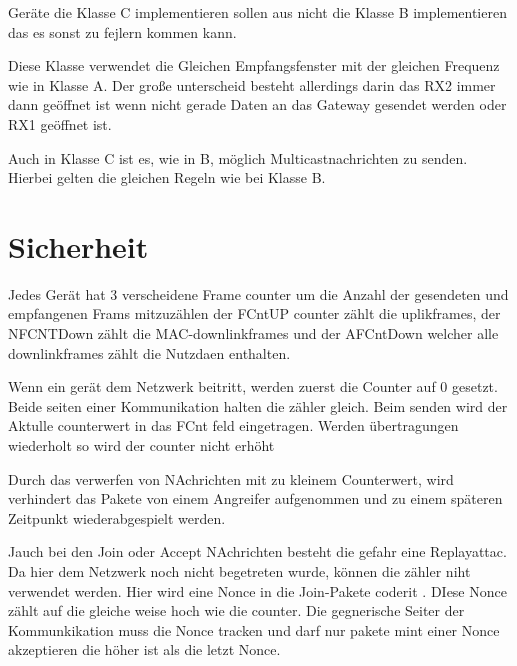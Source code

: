 \documentclass[a4paper,12pt]{article}
\begin{document}
            Geräte die Klasse C implementieren sollen aus nicht die Klasse B implementieren das es sonst zu fejlern 
            kommen kann.

            Diese Klasse verwendet die Gleichen Empfangsfenster mit der gleichen Frequenz wie in Klasse A. Der große 
            unterscheid besteht allerdings darin das RX2 immer dann geöffnet ist wenn nicht gerade Daten an das 
            Gateway gesendet werden oder RX1 geöffnet ist. 

            Auch in Klasse C ist es, wie in B, möglich Multicastnachrichten zu senden. Hierbei gelten die gleichen 
            Regeln wie bei Klasse B.

    \section{Sicherheit} \label{sec:Sicherheit}
   
                
       

        \bigbreak

        Jedes Gerät hat 3 verscheidene Frame counter um die Anzahl der gesendeten und empfangenen Frams mitzuzählen der FCntUP counter zählt die
        uplikframes, der NFCNTDown zählt die MAC-downlinkframes und der AFCntDown welcher alle downlinkframes zählt die Nutzdaen enthalten.

        Wenn ein gerät dem Netzwerk beitritt, werden zuerst die Counter auf 0 gesetzt. Beide seiten einer Kommunikation halten die zähler gleich. 
        Beim senden wird der Aktulle counterwert in das FCnt feld eingetragen. Werden übertragungen wiederholt so wird der counter nicht erhöht 

        Durch das verwerfen von NAchrichten mit zu kleinem Counterwert, wird verhindert das Pakete von einem Angreifer aufgenommen und zu einem späteren Zeitpunkt wiederabgespielt werden.
        
        Jauch bei den Join oder Accept NAchrichten besteht die gefahr eine Replayattac. Da hier dem Netzwerk noch nicht begetreten wurde, können die zähler niht verwendet werden. Hier wird eine Nonce in die 
        Join-Pakete coderit . DIese Nonce zählt auf die gleiche weise hoch wie die counter. Die gegnerische Seiter der Kommunkikation muss die Nonce tracken und darf nur pakete mint einer Nonce akzeptieren die höher ist als die letzt Nonce.
       
\end{document}
